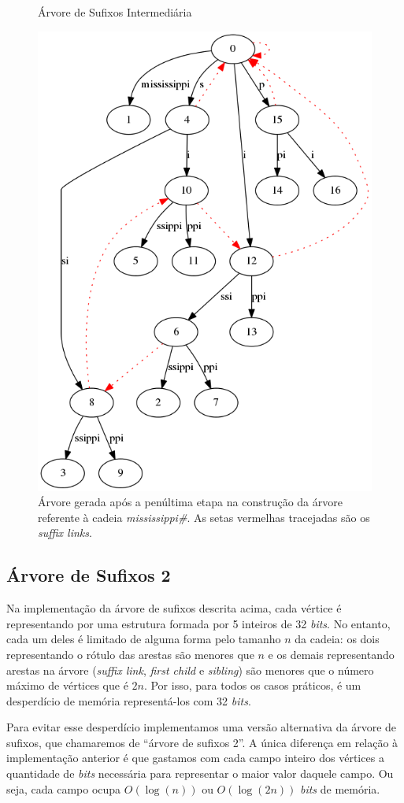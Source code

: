 \documentclass[]{article}
\begin{document}
\begin{figure}
\begin{center}
	{\centering Árvore de Sufixos Intermediária\par}
	\includegraphics[width=.5\textwidth]{images/tree}
\end{center}

\caption{Árvore gerada após a penúltima etapa na construção da árvore referente à cadeia \textit{mississippi\#}. As setas vermelhas tracejadas são os \textit{suffix links}.}
\label{fig:tree}
\end{figure}

\subsection{Árvore de Sufixos 2}

Na implementação da árvore de sufixos descrita acima, cada vértice é representando por uma estrutura formada por 5 inteiros de 32 \textit{bits}. No entanto, cada um deles é limitado de alguma forma pelo tamanho $n$ da cadeia: os dois representando o rótulo das arestas são menores que $n$ e os demais representando arestas na árvore (\textit{suffix link}, \textit{first child} e \textit{sibling}) são menores que o número máximo de vértices que é $2n$. Por isso, para todos os casos práticos, é um desperdício de memória representá-los com 32 \textit{bits}.

Para evitar esse desperdício implementamos uma versão alternativa da árvore de sufixos, que chamaremos de ``árvore de sufixos 2''. A única diferença em relação à implementação anterior é que gastamos com cada campo inteiro dos vértices a quantidade de \textit{bits} necessária para representar o maior valor daquele campo. Ou seja, cada campo ocupa $O(\log(n))$ ou $O(\log(2n))$ \textit{bits} de memória.
\end{document}
